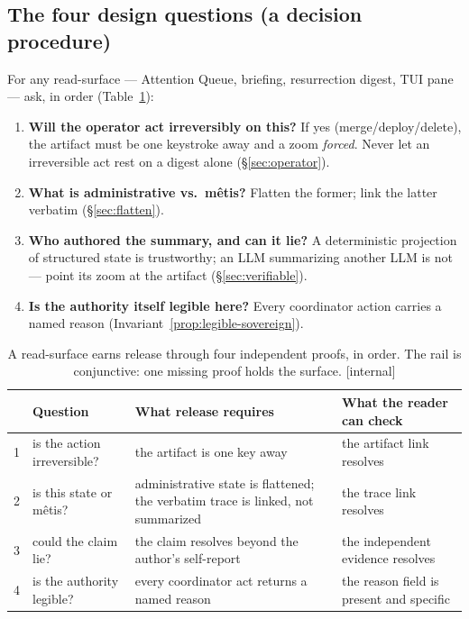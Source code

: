\documentclass[11pt,a4paper]{article}
\theoremstyle{definition}
\theoremstyle{plain}
\begin{document}
\subsection{The four design questions (a decision procedure)}\label{sec:four-questions}

For any read-surface --- Attention Queue, briefing, resurrection digest, TUI pane ---
ask, in order (Table~\ref{tab:ls-four-questions}):

\begin{enumerate}[leftmargin=1.6em]
\item \textbf{Will the operator act irreversibly on this?} If yes
(merge/deploy/delete), the artifact must be one keystroke away and a zoom
\emph{forced}. Never let an irreversible act rest on a digest alone
(\S\ref{sec:operator}).
\item \textbf{What is administrative vs.\ m\^etis?} Flatten the former; link the
latter verbatim (\S\ref{sec:flatten}).
\item \textbf{Who authored the summary, and can it lie?} A deterministic projection
of structured state is trustworthy; an LLM summarizing another LLM is not --- point
its zoom at the artifact (\S\ref{sec:verifiable}).
\item \textbf{Is the authority itself legible here?} Every coordinator action
carries a named reason (Invariant~\ref{prop:legible-sovereign}).
\end{enumerate}

\begin{table}[H]
\centering
\caption{A read-surface earns release through four independent proofs, in order. The rail is conjunctive: one missing proof holds the surface. [internal]}
\label{tab:ls-four-questions}
\small
\renewcommand{\arraystretch}{1.15}
\begin{tabularx}{\linewidth}{@{}l >{\raggedright\arraybackslash}X >{\raggedright\arraybackslash}X >{\raggedright\arraybackslash}X@{}}
\toprule
& \textbf{Question} & \textbf{What release requires} & \textbf{What the reader can check} \\
\midrule
1 & is the action irreversible? & the artifact is one key away & the artifact link resolves \\
2 & is this state or m\^etis? & administrative state is flattened; the verbatim trace is linked, not summarized & the trace link resolves \\
3 & could the claim lie? & the claim resolves beyond the author's self-report & the independent evidence resolves \\
4 & is the authority legible? & every coordinator act returns a named reason & the reason field is present and specific \\
\bottomrule
\end{tabularx}
\end{table}
\end{document}
